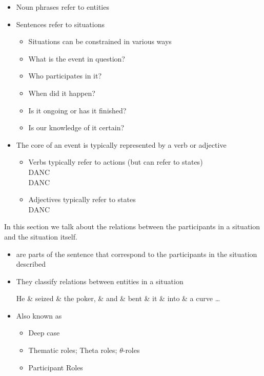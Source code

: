 \documentclass[a4paper,landscape,headrule,footrule,xetex]{foils}
\begin{document}
\begin{itemize}
\item Noun phrases refer to entities
\item Sentences refer to situations
  \begin{itemize}
  \item Situations can be constrained in various ways
  \item What is the event in question?
  \item Who participates in it?
  \item When did it happen?
  \item Is it ongoing or has it finished?
  \item Is our knowledge of it certain?
  \end{itemize}
\item The core of an event is typically represented by a verb or
  adjective 
  \begin{itemize}
  \item Verbs typically refer to actions (but can refer to states)
    \\  DANC
    \\   DANC
  \item Adjectives typically refer to states
    \\  DANC
  \end{itemize}
\end{itemize}

In this section we talk about the relations between the participants
in a situation and the situation itself.

\begin{itemize}
\item  {} are parts of the sentence that 
correspond to the participants in the situation 
described

\item  They classify relations between entities in a situation
\\[2ex] \begin{dependency}
\begin{deptext}[column sep=1em]
He \& seized \& the poker, \& and \& bent \& it \& into \& a curve \ldots \\ %
\end{deptext}
\end{dependency}
 
\item  Also known as
\begin{itemize}
\item  Deep case \citep{Fillmore:1968}
\item  Thematic roles; Theta roles;   $\theta$-roles
\item  Participant Roles
\end{itemize}
\end{itemize}
 
\end{document}
